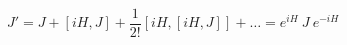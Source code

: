 \begin{equation}
J'=J+[iH,J]+\frac{1}{2!}[iH,[iH,J]]+\ldots = e^{iH}~ J~ e^{-iH}              \label{eq:onuc}
\end{equation}

